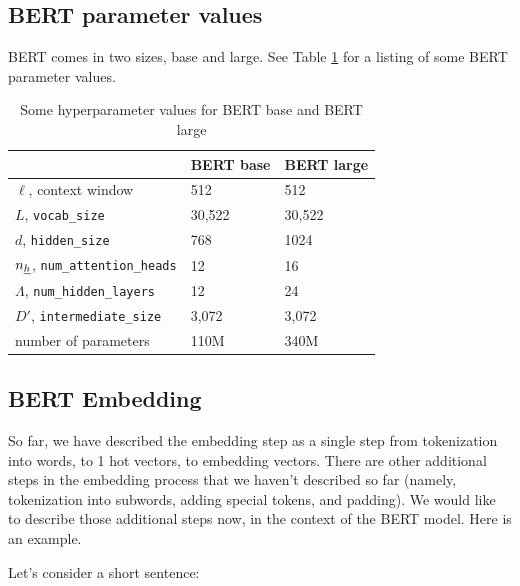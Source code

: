 \subsection{BERT parameter values}

BERT comes in two sizes, base and large.
See Table \ref{tab-bert} for a listing
of some BERT parameter values.

\begin{table}[h!]
\centering
\begin{tabular}{|l|l|l|}
\hline
 & \cellcolor[HTML]{FFFFC7}BERT base & \cellcolor[HTML]{FFFFC7}BERT large \\ \hline
\cellcolor[HTML]{FFFFC7}$\ell$, context window& 512 & 512 \\ \hline
\cellcolor[HTML]{FFFFC7}$L$, {\tt vocab\_size} & 30,522 & 30,522 \\ \hline
\cellcolor[HTML]{FFFFC7}$d$, {\tt hidden\_size} & 768 & 1024 \\ \hline
\cellcolor[HTML]{FFFFC7}$n_\rvh$, {\tt num\_attention\_heads} & 12 & 16 \\ \hline
\cellcolor[HTML]{FFFFC7}$\Lambda$, {\tt num\_hidden\_layers} & 12 & 24 \\ \hline
\cellcolor[HTML]{FFFFC7}$D'$, {\tt intermediate\_size} & 3,072 & 3,072 \\ \hline
\cellcolor[HTML]{FFFFC7}number of parameters & 110M & 340M \\ \hline
\end{tabular}
\caption{Some hyperparameter values for BERT base and BERT large}
\label{tab-bert}
\end{table}

\subsection{BERT Embedding}
So far, we have described the embedding step as a single step
from tokenization into words, to 1 hot vectors, to embedding vectors.
 There are
other additional steps in  the embedding
process that  we haven't
described so far (namely, tokenization
into subwords,
adding special tokens, and
padding). We would like to
describe those additional steps now, in the context of
 the BERT model. Here is an example.


Let's consider a short sentence: 

